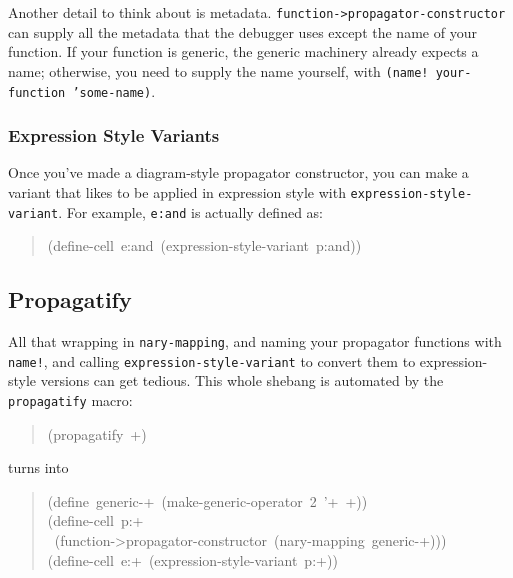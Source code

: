 \documentclass[12pt,letterpaper,english]{article}
\begin{document}
Another detail to think about is metadata.
\texttt{function->propagator-constructor} can supply all the metadata that
the debugger uses except the name of your function.  If your function
is generic, the generic machinery already expects a name; otherwise,
you need to supply the name yourself, with \texttt{(name!  your-function
'some-name)}.



\subsubsection{Expression Style Variants}
\label{expression-style-variants}

Once you've made a diagram-style propagator constructor, you can make
a variant that likes to be applied in expression style with
\texttt{expression-style-variant}.  For example, \texttt{e:and} is actually
defined as:
\begin{quote}{\ttfamily \raggedright \noindent
(define-cell~e:and~(expression-style-variant~p:and))
}\end{quote}



\subsection{Propagatify}
\label{propagatify}

All that wrapping in \texttt{nary-mapping}, and naming your propagator
functions with \texttt{name!}, and calling \texttt{expression-style-variant} to
convert them to expression-style versions can get tedious.  This whole
shebang is automated by the \texttt{propagatify} macro:
\begin{quote}{\ttfamily \raggedright \noindent
(propagatify~+)
}\end{quote}
turns into
\begin{quote}{\ttfamily \raggedright \noindent
(define~generic-+~(make-generic-operator~2~'+~+))~\\
(define-cell~p:+~\\
~(function->propagator-constructor~(nary-mapping~generic-+)))~\\
(define-cell~e:+~(expression-style-variant~p:+))
}\end{quote}
\end{document}
